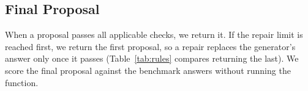 \subsection{Final Proposal}
When a proposal passes all applicable checks, we return it. If the repair limit is reached first, we return the first proposal, so a repair replaces the generator's answer only once it passes (Table~\ref{tab:rules} compares returning the last). We score the final proposal against the benchmark answers without running the function.
